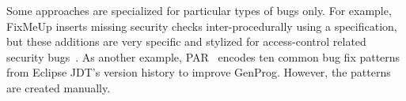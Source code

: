 
	Some approaches are specialized for particular types of bugs only. For example, FixMeUp inserts missing security checks inter-procedurally using a specification, but these additions are very specific and stylized for access-control related security bugs~\cite{son2013fix}. As another example, PAR~\cite{Kim2013:PAR} encodes ten common bug fix patterns from Eclipse JDT's version history to improve GenProg. However, the patterns are created manually.

